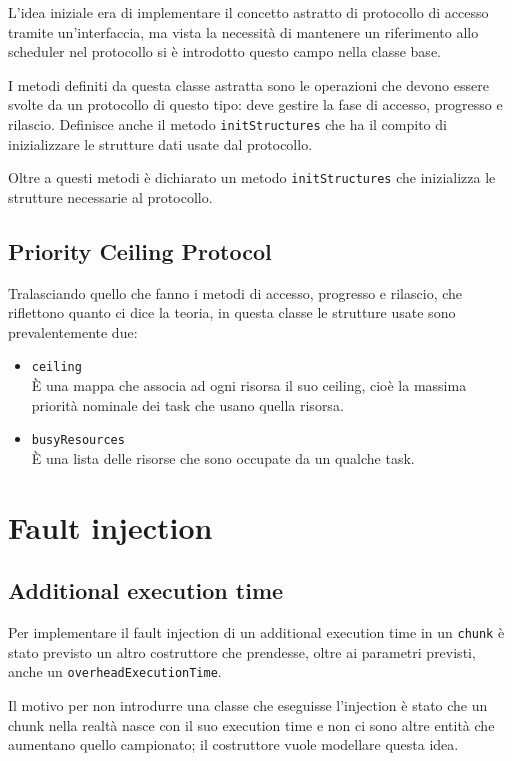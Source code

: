 L'idea iniziale era di implementare il concetto astratto di protocollo di accesso tramite un'interfaccia, ma vista la necessità di mantenere un riferimento allo scheduler nel protocollo si è introdotto questo campo nella classe base.

\myskip

I metodi definiti da questa classe astratta sono le operazioni che devono essere svolte da un protocollo di questo tipo: deve gestire la fase di accesso, progresso e rilascio. Definisce anche il metodo \texttt{initStructures} che ha il compito di inizializzare le strutture dati usate dal protocollo.

Oltre a questi metodi è dichiarato un metodo \texttt{initStructures} che inizializza le strutture necessarie al protocollo.

\subsection{Priority Ceiling Protocol}
Tralasciando quello che fanno i metodi di accesso, progresso e rilascio, che riflettono quanto ci dice la teoria, in questa classe le strutture usate sono prevalentemente due:
\begin{itemize}
    \item \texttt{ceiling} \\
        È una mappa che associa ad ogni risorsa il suo ceiling, cioè la massima priorità nominale dei task che usano quella risorsa.
    \item \texttt{busyResources}\\
        È una lista delle risorse che sono occupate da un qualche task.
\end{itemize}

\section{Fault injection}

\subsection{Additional execution time}
Per implementare il fault injection di un additional execution time in un \texttt{chunk} è stato previsto un altro costruttore che prendesse, oltre ai parametri previsti, anche un \texttt{overheadExecutionTime}.

Il motivo per non introdurre una classe che eseguisse l'injection è stato che un chunk nella realtà nasce con il suo execution time e non ci sono altre entità che aumentano quello campionato; il costruttore vuole modellare questa idea.

